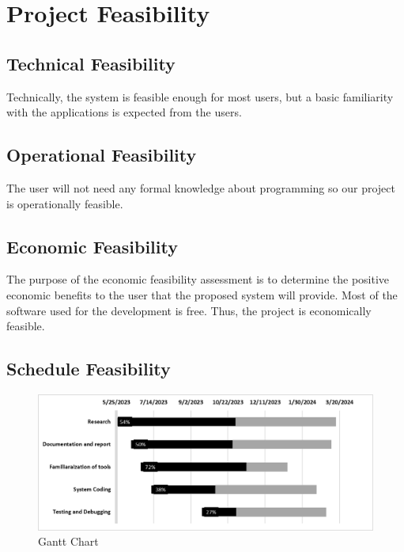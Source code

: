 \section{Project Feasibility}
\vspace{-18pt}
\subsection{Technical Feasibility}
\vspace{-18pt}
Technically, the system is feasible enough for most users, but a basic familiarity with the applications is expected from the users.
\vspace{-18pt}
\subsection{Operational Feasibility}
\vspace{-18pt}
The user will not need any formal knowledge about programming so our project is operationally feasible.
\vspace{-18pt}
\subsection{Economic Feasibility}
\vspace{-18pt}
The purpose of the economic feasibility assessment is to determine the positive economic benefits to the user that the proposed system will provide. Most of the software used for the development is free. Thus, the project is economically feasible.
\vspace{-18pt}
\subsection{Schedule Feasibility}
\begin{figure}[!h] %
\begin{center}
	\includegraphics[width=6in]{images/gc2.png} 
	\caption{Gantt Chart} %
	\label{fig 1 GanttChart} %
\end{center}
\end{figure}
